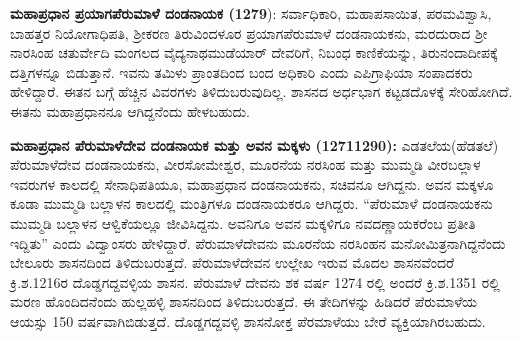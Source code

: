 \newpage

\textbf{ಮಹಾಪ್ರಧಾನ ಪ್ರಯಾಗಪೆರುಮಾಳೆ ದಂಡನಾಯಕ (1279}): ಸರ್ವಾಧಿಕಾರಿ, ಮಹಾಪಸಾಯಿತ, ಪರಮವಿಶ್ವಾಸಿ, ಬಾಹತ್ತರ ನಿಯೋಗಾಧಿಪತಿ, ಶ‍್ರೀಕರಣ ತಿರುವಿಂದಳೂರ ಪ್ರಯಾಗಪೆರುಮಾಳೆ ದಂಡನಾಯಕನು, ಮರದುರಾದ ಶ‍್ರೀ ನಾರಸಿಂಹ ಚತುರ್ವೇದಿ ಮಂಗಲದ ವೈದ್ಯನಾಥಮುಡೆಯಾರ್​ ದೇವರಿಗೆ, ನಿಬಂಧ ಕಾಣಿಕೆಯನ್ನು, ತಿರುನಂದಾದೀಪಕ್ಕೆ ದತ್ತಿಗಳನ್ನೂ ಬಿಡುತ್ತಾನೆ. ಇವನು ತಮಿಳು ಪ್ರಾಂತದಿಂದ ಬಂದ ಅಧಿಕಾರಿ ಎಂದು ಎಪಿಗ್ರಾಫಿಯಾ ಸಂಪಾದಕರು ಹೇಳಿದ್ದಾರೆ. ಈತನ ಬಗ್ಗೆ ಹೆಚ್ಚಿನ ವಿವರಗಳು ತಿಳಿದುಬರುವುದಿಲ್ಲ. ಶಾಸನದ ಅರ್ಧಭಾಗ ಕಟ್ಟಡದೊಳಕ್ಕೆ ಸೇರಿಹೋಗಿದೆ. ಈತನು ಮಹಾಪ್ರಧಾನನೂ ಆಗಿದ್ದನೆಂದು ಹೇಳಬಹುದು.

\textbf{ಮಹಾಪ್ರಧಾನ ಪೆರುಮಾಳೆದೇವ ದಂಡನಾಯಕ ಮತ್ತು ಅವನ ಮಕ್ಕಳು (1271\general{\enginline{-}}1290):} ಎಡತಲೆಯ(ಹೆಡತಲೆ) ಪೆರುಮಾಳೆದೇವ ದಂಡನಾಯಕನು, ವೀರಸೋಮೇಶ್ವರ, ಮೂರನೆಯ ನರಸಿಂಹ ಮತ್ತು ಮುಮ್ಮಡಿ ವೀರಬಲ್ಲಾಳ ಇವರುಗಳ ಕಾಲದಲ್ಲಿ ಸೇನಾಧಿಪತಿಯೂ, ಮಹಾಪ್ರಧಾನ ದಂಡನಾಯಕನು, ಸಚಿವನೂ ಆಗಿದ್ದನು. ಅವನ ಮಕ್ಕಳೂ ಕೂಡಾ ಮುಮ್ಮಡಿ ಬಲ್ಲಾಳನ ಕಾಲದಲ್ಲಿ ಮಂತ್ರಿಗಳೂ ದಂಡನಾಯಕರೂ ಆಗಿದ್ದರು. “ಪೆರುಮಾಳೆ ದಂಡನಾಯಕನು ಮುಮ್ಮಡಿ ಬಲ್ಲಾಳನ ಆಳ್ವಿಕೆಯಲ್ಲೂ ಜೀವಿಸಿದ್ದನು. ಅವನಿಗೂ ಅವನ ಮಕ್ಕಳಿಗೂ ನವದಣ್ಣಾಯಕರೆಂಬ ಪ್ರತೀತಿ ಇದ್ದಿತು” ಎಂದು ವಿದ್ವಾಂಸರು ಹೇಳಿದ್ದಾರೆ. ಪೆರುಮಾಳೆದೇವನು ಮೂರನೆಯ ನರಸಿಂಹನ ಮನೋಮಿತ್ರನಾಗಿದ್ದನೆಂದು ಬೇಲೂರು ಶಾಸನದಿಂದ ತಿಳಿದುಬರುತ್ತದೆ. ಪೆರುಮಾಳೆದೇವನ ಉಲ್ಲೇಖ ಇರುವ ಮೊದಲ ಶಾಸನವೆಂದರೆ ಕ್ರಿ.ಶ.1216ರ ದೊಡ್ಡಗದ್ದವಳ್ಳಿಯ ಶಾಸನ. ಪೆರುಮಾಳೆ ದೇವನು ಶಕ ವರ್ಷ 1274 ರಲ್ಲಿ ಅಂದರೆ ಕ್ರಿ.ಶ.1351 ರಲ್ಲಿ ಮರಣ ಹೊಂದಿದನೆಂದು ಹುಲ್ಲಹಳ್ಳಿ ಶಾಸನದಿಂದ ತಿಳಿದುಬರುತ್ತದೆ. ಈ ತೇದಿಗಳನ್ನು ಹಿಡಿದರೆ ಪೆರುಮಾಳೆಯ ಆಯಸ್ಸು 150 ವರ್ಷವಾಗಿಬಿಡುತ್ತದೆ. ದೊಡ್ಡಗದ್ದವಳ್ಳಿ ಶಾಸನೋಕ್ತ ಪೆರಮಾಳೆಯು ಬೇರೆ ವ್ಯಕ್ತಿಯಾಗಿರಬಹುದು.

